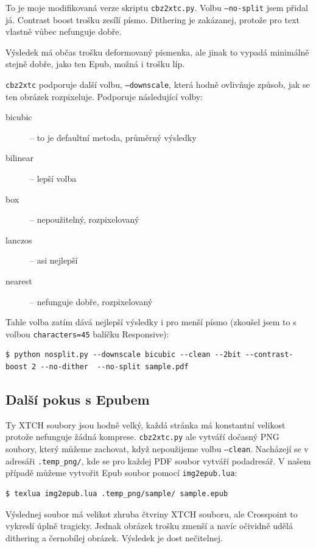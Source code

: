 \documentclass{article}
\begin{document}
To je moje modifikovaná verze skriptu \texttt{cbz2xtc.py}. Volbu \texttt{--no-split} jsem přidal já. Contrast boost trošku
zesílí písmo. Dithering je zakázanej, protože pro text vlastně vůbec nefunguje dobře.

Výsledek má občas trošku deformovaný písmenka, ale jinak to vypadá minimálně stejně dobře, jako ten Epub, možná i trošku líp.

\texttt{cbz2xtc} podporuje další volbu, \texttt{--downscale}, která hodně ovlivňuje způsob, jak se ten obrázek rozpixeluje. Podporuje následující volby:

\begin{description}
  \item[bicubic] -- to je defaultní metoda, průměrný výsledky
  \item[bilinear] -- lepší volba
  \item[box] -- nepoužitelný, rozpixelovaný
  \item[lanczos] -- asi nejlepší
  \item[nearest] -- nefunguje dobře, rozpixelovaný
\end{description}

Tahle volba zatím dává nejlepší výsledky i pro menší písmo (zkoušel jsem to s volbou \texttt{characters=45} balíčku Responsive):
\begin{lstlisting}
$ python nosplit.py --downscale bicubic --clean --2bit --contrast-boost 2 --no-dither  --no-split sample.pdf 
\end{lstlisting}


\subsection{Další pokus s Epubem}

Ty XTCH soubory jsou hodně velký, každá stránka má konstantní velikost protože nefunguje žádná komprese. \texttt{cbz2xtc.py} ale vytváří
dočasný PNG soubory, který můžeme zachovat, když nepoužijeme volbu \texttt{--clean}. Nacházejí se v adresáři \texttt{.temp\_png/}, kde 
se pro každej PDF soubor vytváří podadresář. V našem případě můžeme vytvořit Epub soubor pomocí \texttt{img2epub.lua}:

\begin{lstlisting}
$ texlua img2epub.lua .temp_png/sample/ sample.epub
\end{lstlisting}

Výslednej soubor má velikot zhruba čtvriny XTCH souboru, ale Crosspoint to
vykreslí úplně tragicky. Jednak obrázek trošku zmenší a navíc očividně udělá
dithering a černobílej obrázek. Výsledek je dost nečitelnej.
\end{document}
